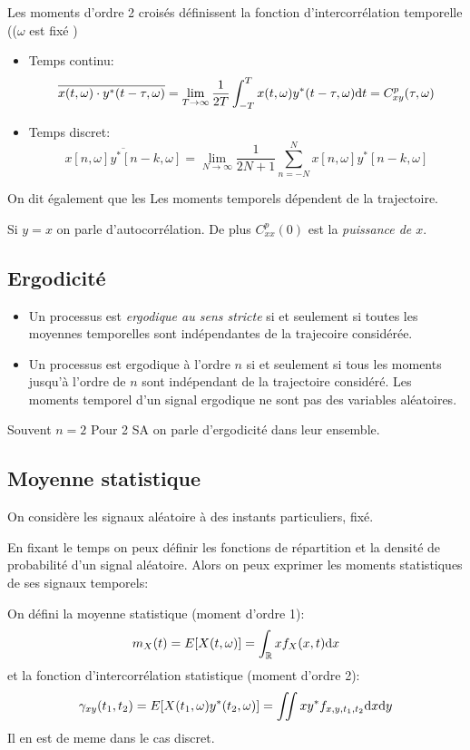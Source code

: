 \documentclass[main.tex]{subfiles}
\begin{document}
\begin{defin}
  Les moments d'ordre 2 croisés définissent la fonction d'intercorrélation temporelle (($\omega$ est fixé )
  \begin{itemize}
  \item Temps continu:
    \[
      \overline{x(t,\omega)\cdot y^*(t-\tau,\omega)} = \lim_{T\to\infty}\frac{1}{2T}\int_{-T}^{T}x(t,\omega) y^*(t-\tau,\omega)\mbox{d} t =C^p_{xy}(\tau,\omega)
    \]
  \item Temps discret:
    \[
\overline{x[n,\omega]y^*[n-k,\omega]} =\lim_{N\to\infty}\frac{1}{2N+1} \sum_{n=-N}^{N}x[n,\omega]y^*[n-k,\omega]
    \]
  \end{itemize}
\end{defin}

\begin{rem}
On dit également que les  Les moments temporels dépendent de la trajectoire.

Si $y=x$ on parle d'autocorrélation. De plus $C_{xx}^p(0)$ est la \emph{puissance de $x$}.
\end{rem}
\subsection{Ergodicité}
\begin{defin}
  \begin{itemize}
  \item Un processus est \emph{ergodique au sens stricte}
    si et seulement si toutes les moyennes temporelles sont indépendantes de la trajecoire considérée.
  \item
    Un processus est ergodique à l'ordre $n$ si et seulement si tous les moments jusqu'à l'ordre de $n$ sont indépendant de la trajectoire considéré.
    Les moments temporel d'un signal ergodique ne sont pas des variables aléatoires.
\end{itemize}
\end{defin}
\begin{rem}
  Souvent $n=2$ Pour 2 SA on parle d'ergodicité dans leur ensemble.
\end{rem}

\subsection{Moyenne statistique}

On considère les signaux aléatoire à des instants particuliers, fixé.

\begin{rem}
  En fixant le temps on peux définir les fonctions de répartition et la densité de probabilité  d'un signal aléatoire. Alors on peux exprimer les moments statistiques de ses signaux temporels:
\end{rem}
\begin{defin}
  On défini la moyenne statistique (moment d'ordre 1):
  \[
    m_X(t) = E[X(t,\omega)] = \int_{\mathbb{R}}^{}x f_X(x,t) \mbox{d} x
  \]
  et la fonction d'intercorrélation statistique (moment d'ordre 2):
  \[
    \gamma_{xy}(t_1,t_2) =E[X(t_1,\omega)y^{*}(t_2,\omega)] = \iint xy^{*}f_{x,y,t_1,t_2}\mbox{d} x\mbox{d} y
  \]
  Il en est de meme dans le cas discret.
\end{defin}
\end{document}
